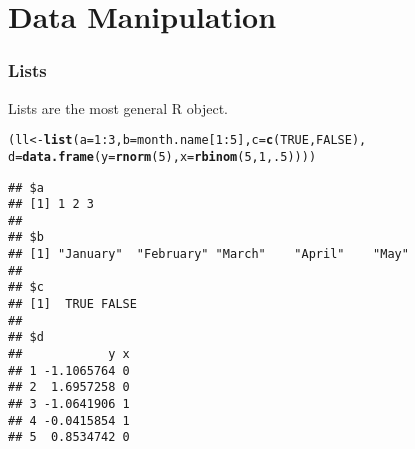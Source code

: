 \documentclass[paper=screen,mathserif]{beamer}\usepackage[]{graphicx}\usepackage[]{color}
\makeatletter
\newcommand{\hlnum}[1]{\textcolor[rgb]{0.686,0.059,0.569}{#1}}%
\newcommand{\hlopt}[1]{\textcolor[rgb]{0,0,0}{#1}}%
\newcommand{\hlstd}[1]{\textcolor[rgb]{0.345,0.345,0.345}{#1}}%
\newcommand{\hlkwb}[1]{\textcolor[rgb]{0.69,0.353,0.396}{#1}}%
\newcommand{\hlkwc}[1]{\textcolor[rgb]{0.333,0.667,0.333}{#1}}%
\newcommand{\hlkwd}[1]{\textcolor[rgb]{0.737,0.353,0.396}{\textbf{#1}}}%
\newenvironment{kframe}{%
 \def\at@end@of@kframe{}%
 \ifinner\ifhmode%
  \def\at@end@of@kframe{\end{minipage}}%
  \begin{minipage}{\columnwidth}%
 \fi\fi%
 \def\FrameCommand##1{\hskip\@totalleftmargin \hskip-\fboxsep
 \colorbox{shadecolor}{##1}\hskip-\fboxsep
     \hskip-\linewidth \hskip-\@totalleftmargin \hskip\columnwidth}%
 \MakeFramed {\advance\hsize-\width
   \@totalleftmargin\z@ \linewidth\hsize
   \@setminipage}}%
 {\par\unskip\endMakeFramed%
 \at@end@of@kframe}
\newenvironment{knitrout}{}{} %
\newcommand{\ft}[1]{\frametitle{#1}}
\makeatother
\begin{document}
\section{Data Manipulation}


\begin{frame}[fragile]
  \ft{Lists}
  
  Lists are the most general R object. 
\begin{knitrout}\scriptsize
{}\color{fgcolor}\begin{kframe}
\begin{alltt}
\hlstd{(ll} \hlkwb{<-} \hlkwd{list}\hlstd{(}\hlkwc{a} \hlstd{=} \hlnum{1}\hlopt{:}\hlnum{3}\hlstd{,} \hlkwc{b} \hlstd{= month.name[}\hlnum{1}\hlopt{:}\hlnum{5}\hlstd{],} \hlkwc{c} \hlstd{=} \hlkwd{c}\hlstd{(}\hlnum{TRUE}\hlstd{,} \hlnum{FALSE}\hlstd{),}
            \hlkwc{d} \hlstd{=} \hlkwd{data.frame}\hlstd{(}\hlkwc{y} \hlstd{=} \hlkwd{rnorm}\hlstd{(}\hlnum{5}\hlstd{),} \hlkwc{x} \hlstd{=} \hlkwd{rbinom}\hlstd{(}\hlnum{5}\hlstd{,} \hlnum{1}\hlstd{,} \hlnum{.5}\hlstd{))))}
\end{alltt}
\begin{verbatim}
## $a
## [1] 1 2 3
## 
## $b
## [1] "January"  "February" "March"    "April"    "May"     
## 
## $c
## [1]  TRUE FALSE
## 
## $d
##            y x
## 1 -1.1065764 0
## 2  1.6957258 0
## 3 -1.0641906 1
## 4 -0.0415854 1
## 5  0.8534742 0
\end{verbatim}
\end{kframe}
\end{knitrout}
  
\end{frame}
\end{document}
